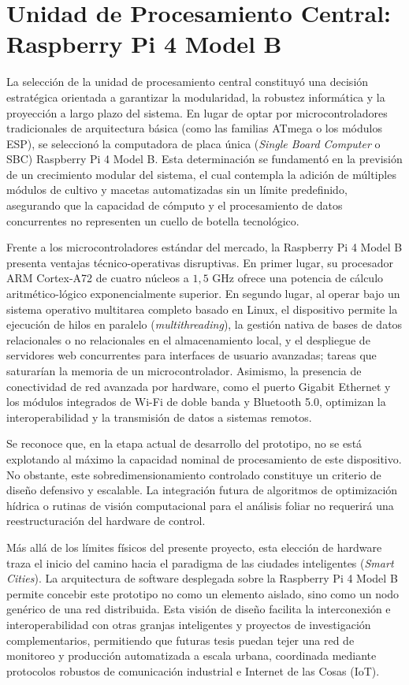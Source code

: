 \section{Unidad de Procesamiento Central: Raspberry Pi 4 Model B}
\label{sec:raspberry_pi}

La selección de la unidad de procesamiento central constituyó una decisión estratégica orientada a garantizar la modularidad, la robustez informática y la proyección a largo plazo del sistema. En lugar de optar por microcontroladores tradicionales de arquitectura básica (como las familias ATmega o los módulos ESP), se seleccionó la computadora de placa única (\textit{Single Board Computer} o SBC) Raspberry Pi 4 Model B. Esta determinación se fundamentó en la previsión de un crecimiento modular del sistema, el cual contempla la adición de múltiples módulos de cultivo y macetas automatizadas sin un límite predefinido, asegurando que la capacidad de cómputo y el procesamiento de datos concurrentes no representen un cuello de botella tecnológico.

Frente a los microcontroladores estándar del mercado, la Raspberry Pi 4 Model B presenta ventajas técnico-operativas disruptivas. En primer lugar, su procesador ARM Cortex-A72 de cuatro núcleos a $1{,}5\text{ GHz}$ ofrece una potencia de cálculo aritmético-lógico exponencialmente superior. En segundo lugar, al operar bajo un sistema operativo multitarea completo basado en Linux, el dispositivo permite la ejecución de hilos en paralelo (\textit{multithreading}), la gestión nativa de bases de datos relacionales o no relacionales en el almacenamiento local, y el despliegue de servidores web concurrentes para interfaces de usuario avanzadas; tareas que saturarían la memoria de un microcontrolador. Asimismo, la presencia de conectividad de red avanzada por hardware, como el puerto Gigabit Ethernet y los módulos integrados de Wi-Fi de doble banda y Bluetooth 5.0, optimizan la interoperabilidad y la transmisión de datos a sistemas remotos.

Se reconoce que, en la etapa actual de desarrollo del prototipo, no se está explotando al máximo la capacidad nominal de procesamiento de este dispositivo. No obstante, este sobredimensionamiento controlado constituye un criterio de diseño defensivo y escalable. La integración futura de algoritmos de optimización hídrica o rutinas de visión computacional para el análisis foliar no requerirá una reestructuración del hardware de control.

Más allá de los límites físicos del presente proyecto, esta elección de hardware traza el inicio del camino hacia el paradigma de las ciudades inteligentes (\textit{Smart Cities}). La arquitectura de software desplegada sobre la Raspberry Pi 4 Model B permite concebir este prototipo no como un elemento aislado, sino como un nodo genérico de una red distribuida. Esta visión de diseño facilita la interconexión e interoperabilidad con otras granjas inteligentes y proyectos de investigación complementarios, permitiendo que futuras tesis puedan tejer una red de monitoreo y producción automatizada a escala urbana, coordinada mediante protocolos robustos de comunicación industrial e Internet de las Cosas (IoT).

